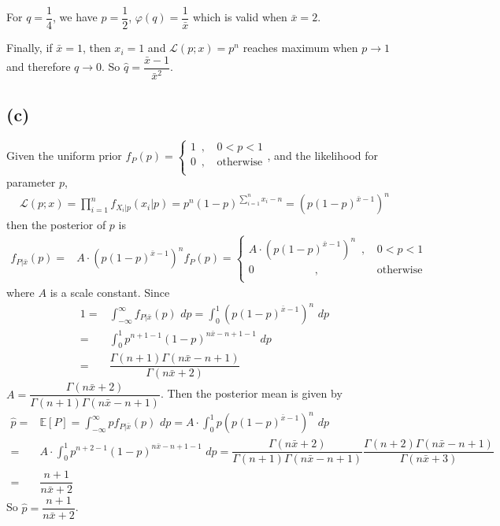 \documentclass[a4paper,12pt,titlepage]{article}
\begin{document}
For $q=\dfrac{1}{4}$, we have $p=\dfrac{1}{2}$, $\varphi(q)=\dfrac{1}{\bar{x}}$ which is valid when $\bar{x}=2$.

Finally, if $\bar{x}=1$, then $x_i=1$ and $\mathcal{L}(p;x)=p^n$ reaches maximum when $p\rightarrow1$ and therefore $q\rightarrow0$.
So $\hat{q}=\dfrac{\bar{x}-1}{\bar{x}^2}$.

\subsection*{(c)}
Given the uniform prior $f_P(p)=\left\{
\begin{aligned}
1\,\,\,,\,&0<p<1\\
0\,\,\,,\,&\text{otherwise}\\
\end{aligned}
\right.$, and the likelihood for parameter $p$,
\begin{align*}
    \mathcal{L}(p;x)=\prod\limits_{i=1}^nf_{X_i|p}(x_i | p)=p^n(1 - p)^{\sum\limits_{i=1}^nx_i-n}=(p(1-p)^{\bar{x}-1})^n
\end{align*}
then the posterior of $p$ is
\begin{align*}
    f_{P|\bar{x}}(p)=&A\cdot (p(1-p)^{\bar{x}-1})^nf_{P}(p)=\left\{
\begin{aligned}
A\cdot(p(1-p)^{\bar{x}-1})^n\,\,\,,\,&0<p<1\\
0\quad\quad\quad\quad\quad\,\,\,,\,&\text{otherwise}\\
\end{aligned}
\right.
\end{align*}
where $A$ is a scale constant. Since 
\begin{align*}
    1=&\int_{-\infty}^{\infty}f_{P|\bar{x}}(p)\,\,dp=\int_{0}^{1}(p(1-p)^{\bar{x}-1})^n\,\,dp\\
    =&\int_{0}^{1}p^{n+1-1}(1-p)^{n\bar{x}-n+1-1}\,\,dp\\
    =&\dfrac{\Gamma(n+1)\Gamma(n\bar{x}-n+1)}{\Gamma(n\bar{x}+2)}
\end{align*}
$A=\dfrac{\Gamma(n\bar{x}+2)}{\Gamma(n+1)\Gamma(n\bar{x}-n+1)}$. Then the posterior mean is given by
\begin{align*}
    \hat{p}=&\mathbb{E}[P]=\int_{-\infty}^{\infty}pf_{P|\bar{x}}(p)\,\,dp=A\cdot\int_{0}^{1}p(p(1-p)^{\bar{x}-1})^n\,\,dp\\
     =&A\cdot\int_{0}^{1}p^{n+2-1}(1-p)^{n\bar{x}-n+1-1}\,\,dp=\dfrac{\Gamma(n\bar{x}+2)}{\Gamma(n+1)\Gamma(n\bar{x}-n+1)}\dfrac{\Gamma(n+2)\Gamma(n\bar{x}-n+1)}{\Gamma(n\bar{x}+3)}\\
     =&\dfrac{n+1}{n\bar{x}+2}
\end{align*}
So $\hat{p}=\dfrac{n+1}{n\bar{x}+2}$.
\end{document}
